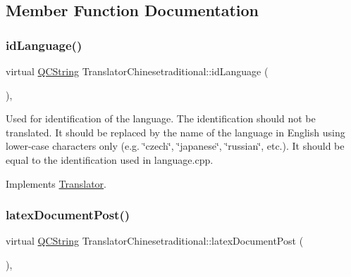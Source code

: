 \subsection{Member Function Documentation}
\mbox{\label{class_translator_chinesetraditional_a9bc148d1e1b9c00b90e35b935e3bd069}} 
\subsubsection{\texorpdfstring{idLanguage()}{idLanguage()}}
{\footnotesize\ttfamily virtual \mbox{\hyperlink{class_q_c_string}{Q\+C\+String}} Translator\+Chinesetraditional\+::id\+Language (\begin{DoxyParamCaption}{ }\end{DoxyParamCaption})\hspace{0.3cm}{\ttfamily [inline]}, {\ttfamily [virtual]}}

Used for identification of the language. The identification should not be translated. It should be replaced by the name of the language in English using lower-\/case characters only (e.\+g. \char`\"{}czech\char`\"{}, \char`\"{}japanese\char`\"{}, \char`\"{}russian\char`\"{}, etc.). It should be equal to the identification used in language.\+cpp. 

Implements \mbox{\hyperlink{class_translator}{Translator}}.

\mbox{\label{class_translator_chinesetraditional_a50297eafc68fea68a1db8e384dfd415c}} 
\subsubsection{\texorpdfstring{latexDocumentPost()}{latexDocumentPost()}}
{\footnotesize\ttfamily virtual \mbox{\hyperlink{class_q_c_string}{Q\+C\+String}} Translator\+Chinesetraditional\+::latex\+Document\+Post (\begin{DoxyParamCaption}{ }\end{DoxyParamCaption})\hspace{0.3cm}{\ttfamily [inline]}, {\ttfamily [virtual]}}

